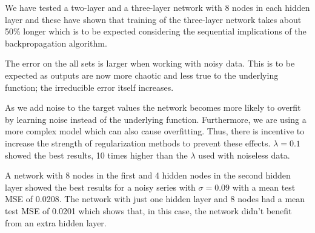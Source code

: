 \documentclass[a4paper]{article}
\begin{document}

We have tested a two-layer and a three-layer network with 8 nodes in each hidden layer and these have shown that training of the three-layer network takes about 50\% longer which is to be expected considering the sequential implications of the backpropagation algorithm.

The error on the all sets is larger when working with noisy data. This is to be expected as outputs are now more chaotic and less true to the underlying function; the irreducible error itself increases.


As we add noise to the target values the network becomes more likely to overfit by learning noise instead of the underlying function. Furthermore, we are using a more complex model which can also cause overfitting. Thus, there is incentive to increase the strength of regularization methods to prevent these effects. $\lambda = 0.1$ showed the best results, 10 times higher than the $\lambda$ used with noiseless data. %


A network with 8 nodes in the first and 4 hidden nodes in the second hidden layer showed the best results for a noisy series with $\sigma = 0.09$ with a mean test MSE of 0.0208. The network with just one hidden layer and 8 nodes had a mean test MSE of 0.0201 which shows that, in this case, the network didn't benefit from an extra hidden layer.
\end{document}
